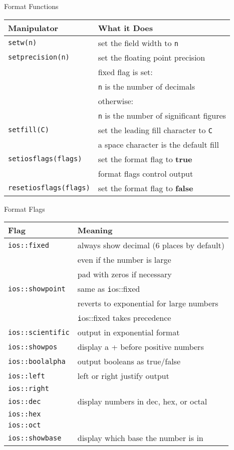 \documentclass[xcolor={dvipsnames}]{beamer}
\begin{document}
\begin{frame}{Format Functions}
\begin{tabular}{|l|l|}
\hline
\textbf{Manipulator} & \textbf{What it Does} \\
\hline
\texttt{setw(n)} & set the field width to \texttt n \\
\hline
\texttt{setprecision(n)} & set the floating point precision \\
			    & fixed flag is set:\\
			    & \texttt{n} is the number of decimals \\
			   & otherwise: \\
			   & \texttt{n} is the number of significant figures\\
\hline
\texttt{setfill(C)} & set the leading fill character to \texttt{C}\\
  		    	& a space character is the default fill\\
\hline
\hline
\texttt{setiosflags(flags)}    & set the format flag to \textbf{true}\\
				& format flags control output\\
\hline
\texttt{resetiosflags(flags)} & set the format flag to \textbf{false}\\
\hline
\end{tabular}
\end{frame}
\begin{frame}{Format Flags}
\begin{tabular}{ | l|l|}
\hline
\textbf{Flag} & \textbf{Meaning} \\
\hline
\hline
\texttt{ios::fixed} & always show decimal (6 places by default)\\
		       & even if the number is large\\
		       & pad with zeros if necessary\\
\hline
\texttt{ios::showpoint}&  same as \texttt ios::fixed\\
			    & reverts to exponential for large numbers\\
			    &\texttt ios::fixed takes precedence\\

\hline
\hline
\texttt{ios::scientific} & output in exponential format\\
\hline
\texttt{ios::showpos} & display a + before positive numbers \\
\hline
\texttt{ios::boolalpha} & output booleans as true/false\\
\hline
\hline
\texttt{ios::left} & left or right justify output\\
\texttt{ios::right} &\\
\hline
\hline
\texttt{ios::dec} &display  numbers in dec, hex, or octal\\
\texttt{ios::hex} & \\
\texttt{ios::oct} & \\
\hline
\texttt{ios::showbase} & display which base the number is in\\
\hline
\end{tabular}
\end{frame}
\end{document}
